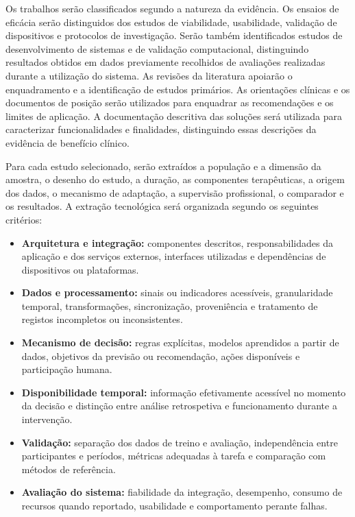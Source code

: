 Os trabalhos serão classificados segundo a natureza da evidência. Os ensaios de eficácia serão distinguidos dos estudos de viabilidade, usabilidade, validação de dispositivos e protocolos de investigação. Serão também identificados estudos de desenvolvimento de sistemas e de validação computacional, distinguindo resultados obtidos em dados previamente recolhidos de avaliações realizadas durante a utilização do sistema. As revisões da literatura apoiarão o enquadramento e a identificação de estudos primários. As orientações clínicas e os documentos de posição serão utilizados para enquadrar as recomendações e os limites de aplicação. A documentação descritiva das soluções será utilizada para caracterizar funcionalidades e finalidades, distinguindo essas descrições da evidência de benefício clínico.

Para cada estudo selecionado, serão extraídos a população e a dimensão da amostra, o desenho do estudo, a duração, as componentes terapêuticas, a origem dos dados, o mecanismo de adaptação, a supervisão profissional, o comparador e os resultados. A extração tecnológica será organizada segundo os seguintes critérios:

\begin{itemize}
    \item \textbf{Arquitetura e integração:} componentes descritos, responsabilidades da aplicação e dos serviços externos, interfaces utilizadas e dependências de dispositivos ou plataformas.
    \item \textbf{Dados e processamento:} sinais ou indicadores acessíveis, granularidade temporal, transformações, sincronização, proveniência e tratamento de registos incompletos ou inconsistentes.
    \item \textbf{Mecanismo de decisão:} regras explícitas, modelos aprendidos a partir de dados, objetivos da previsão ou recomendação, ações disponíveis e participação humana.
    \item \textbf{Disponibilidade temporal:} informação efetivamente acessível no momento da decisão e distinção entre análise retrospetiva e funcionamento durante a intervenção.
    \item \textbf{Validação:} separação dos dados de treino e avaliação, independência entre participantes e períodos, métricas adequadas à tarefa e comparação com métodos de referência.
    \item \textbf{Avaliação do sistema:} fiabilidade da integração, desempenho, consumo de recursos quando reportado, usabilidade e comportamento perante falhas.
\end{itemize}

